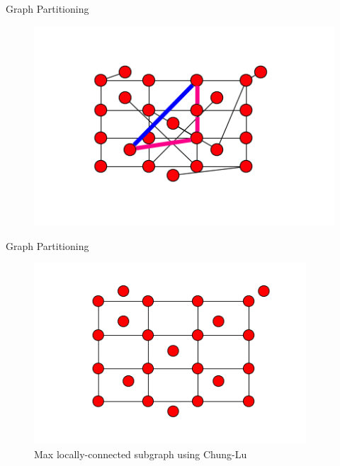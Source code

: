 \documentclass[xcolor=dvipsnames,10pt]{beamer}
\begin{document}
\begin{frame}{Graph Partitioning}
\begin{figure}
\begin{center}
\includegraphics[width = 4.5in]{badedge.png}
\end{center}
\end{figure}
\end{frame}

\begin{frame}{Graph Partitioning}
\begin{figure}
\begin{center}
\includegraphics[width = 4in]{planargraph.png}
\caption{Max locally-connected subgraph using Chung-Lu \cite{Chung:2004}}
\end{center}
\end{figure}
\end{frame}
\end{document}
